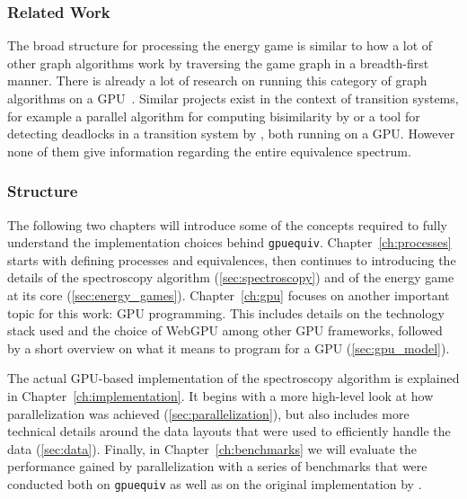 \subsubsection{Related Work}

The broad structure for processing the energy game
is similar to how a lot of other graph algorithms work
by traversing the game graph in a breadth-first manner.
There is already a lot of research on running this category of graph
algorithms on a GPU~\cite{Merrill2015,Busato2018,Hijma2023}.
Similar projects exist in the context of transition systems,
for example a parallel algorithm for computing bisimilarity
by \textcite{Martens2023}
or a tool for detecting deadlocks in a transition system
by \textcite{Wijs2023},
both running on a GPU\@.
However none of them give information
regarding the entire equivalence spectrum.

\subsubsection{Structure}

The following two chapters will introduce some of the concepts required to
fully understand the implementation choices behind \texttt{gpuequiv}.
Chapter~\ref{ch:processes} starts with defining processes and equivalences,
then continues to introducing the details of
the spectroscopy algorithm (\ref{sec:spectroscopy})
and of the energy game at its core (\ref{sec:energy_games}).
Chapter~\ref{ch:gpu} focuses on another important topic for this work:
GPU programming.
This includes details on the technology stack used
and the choice of WebGPU among other GPU frameworks,
followed by a short overview on what it means
to program for a GPU (\ref{sec:gpu_model}).

The actual GPU-based implementation of the spectroscopy algorithm is explained
in Chapter~\ref{ch:implementation}.
It begins with a more high-level look at how parallelization was achieved
(\ref{sec:parallelization}),
but also includes more technical details around the data layouts
that were used to efficiently handle the data (\ref{sec:data}).
Finally, in Chapter~\ref{ch:benchmarks} we will evaluate the performance
gained by parallelization with a series of benchmarks that were
conducted both on \texttt{gpuequiv} as well as on the original implementation
by \textcite{bisping2023process}.
